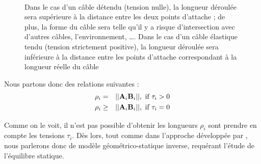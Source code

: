 \begin{figure}[!ht]
  \centering
       \hfill
     \\
    \caption{\footnotesize{Dans le cas d'un câble détendu (tension nulle), la longueur déroulée sera supérieure à la distance entre les deux points d'attache ; de plus, la forme du câble sera telle qu'il y a risque d'intersection avec d'autres câbles, l'environnement, \dots. Dans le cas d'un câble élastique tendu (tension strictement positive), la longueur déroulée sera inférieure à la distance entre les points d'attache correspondant à la longueur réelle du câble}}
\label{intro:fig6}
\end{figure}

Nous partons donc des relations suivantes :
\begin{eqnarray}
\rho_i &=& ||{\bf A}_i {\bf B}_i||, \hbox{ if } \tau_i > 0 \\ 
\rho_i &\geq& ||{\bf A}_i {\bf B}_i||, \hbox{ if } \tau_i = 0
\label{intro:eq1}
\end{eqnarray}

Comme on le voit, il n'est pas possible d'obtenir les longueurs $\rho_i$ sont prendre en compte les tensions $\tau_i$. Dès lors, tout comme dans l'approche développée par \cite{2010:Carricato.Merlet}, nous parlerons donc de modèle géométrico-statique inverse, requérant l'étude de l'équilibre statique.

